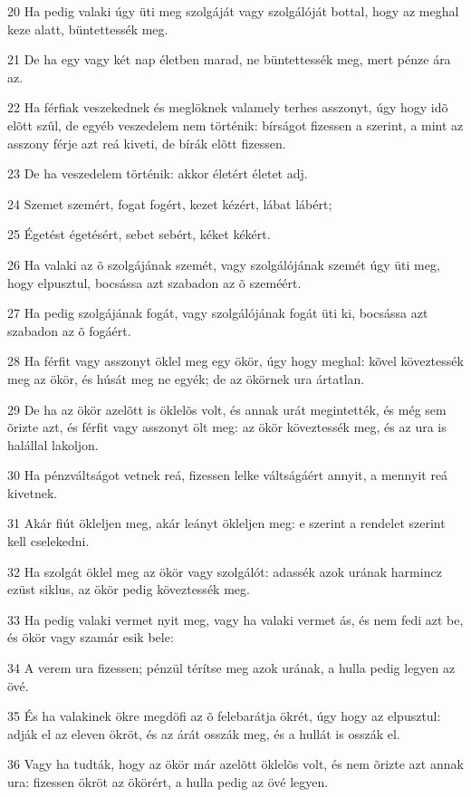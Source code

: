 \par 20 Ha pedig valaki úgy üti meg szolgáját vagy szolgálóját bottal, hogy az meghal keze alatt, büntettessék meg.
\par 21 De ha egy vagy két nap életben marad, ne büntettessék meg, mert pénze ára az.
\par 22 Ha férfiak veszekednek és meglöknek valamely terhes asszonyt, úgy hogy idõ elõtt szûl, de egyéb veszedelem nem történik: bírságot fizessen a szerint, a mint az asszony férje azt reá kiveti, de bírák elõtt fizessen.
\par 23 De ha veszedelem történik: akkor életért életet adj.
\par 24 Szemet szemért, fogat fogért, kezet kézért, lábat lábért;
\par 25 Égetést égetésért, sebet sebért, kéket kékért.
\par 26 Ha valaki az õ szolgájának szemét, vagy szolgálójának szemét úgy üti meg, hogy elpusztul, bocsássa azt szabadon az õ szeméért.
\par 27 Ha pedig szolgájának fogát, vagy szolgálójának fogát üti ki, bocsássa azt szabadon az õ fogáért.
\par 28 Ha férfit vagy asszonyt öklel meg egy ökör, úgy hogy meghal: kõvel köveztessék meg az ökör, és húsát meg ne egyék; de az ökörnek ura ártatlan.
\par 29 De ha az ökör azelõtt is öklelõs volt, és annak urát megintették, és még sem õrizte azt, és férfit vagy asszonyt ölt meg: az ökör köveztessék meg, és az ura is halállal lakoljon.
\par 30 Ha pénzváltságot vetnek reá, fizessen lelke váltságáért annyit, a mennyit reá kivetnek.
\par 31 Akár fiút ökleljen meg, akár leányt ökleljen meg: e szerint a rendelet szerint kell cselekedni.
\par 32 Ha szolgát öklel meg az ökör vagy szolgálót: adassék azok urának harmincz ezüst siklus, az ökör pedig köveztessék meg.
\par 33 Ha pedig valaki vermet nyit meg, vagy ha valaki vermet ás, és nem fedi azt be, és ökör vagy szamár esik bele:
\par 34 A verem ura fizessen; pénzül térítse meg azok urának, a hulla pedig legyen az övé.
\par 35 És ha valakinek ökre megdöfi az õ felebarátja ökrét, úgy hogy az elpusztul: adják el az eleven ökröt, és az árát osszák meg, és a hullát is osszák el.
\par 36 Vagy ha tudták, hogy az ökör már azelõtt öklelõs volt, és nem õrizte azt annak ura: fizessen ökröt az ökörért, a hulla pedig az övé legyen.

